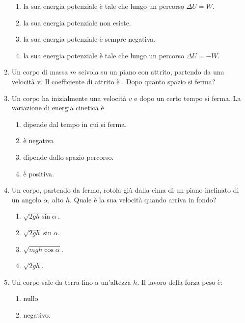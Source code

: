 \documentclass{article}
\begin{document}
\begin{enumerate}
\begin{enumerate}[label=\Alph*.]
    \item la sua energia potenziale è tale che lungo un percorso $\Delta U=W$.
    \item la sua energia potenziale non esiste.
    \item la sua energia potenziale è sempre negativa.
    \item la sua energia potenziale è tale che lungo un percorso $\Delta U=-W$.
  \end{enumerate}
  \item Un corpo di massa $m$ scivola su un piano con attrito, partendo da una velocità v. Il coefficiente di attrito è \mu. Dopo quanto spazio si ferma?
  \begin{enumerate}[label=\Alph*.]
    \item $\frac{1}{2}v^2+\mu g$.
    \item $\frac{1}{2}v^2-\mu g$.
    \item $\frac{v^2}{2g\mu}}$.
    \item $\frac{2v^2}{g\mu}}$.
  \end{enumerate}
  \item Un corpo ha inizialmente una velocità $v$ e dopo un certo tempo si ferma. La variazione di energia cinetica è
  \begin{enumerate}[label=\Alph*.]
    \item dipende dal tempo in cui si ferma.
    \item è negativa
    \item dipende dallo spazio percorso.
    \item è positiva.
  \end{enumerate}
  \item Un corpo, partendo da fermo, rotola giù dalla cima di un piano inclinato di un angolo $\alpha$, alto $h$. Quale è la sua velocità quando arriva in fondo?
  \begin{enumerate}[label=\Alph*.]
    \item $\sqrt{2gh\sin\alpha}$.
    \item $\sqrt{2gh}\sin\alpha$.
    \item $\sqrt{mgh\cos\alpha}$.
    \item $\sqrt{2gh}$.
  \end{enumerate}
  \item Un corpo sale da terra fino a un'altezza $h$. Il lavoro della forza peso è:
  \begin{enumerate}[label=\Alph*.]
    \item nullo
    \item negativo.

\end{enumerate}
\end{enumerate}
\end{document}
